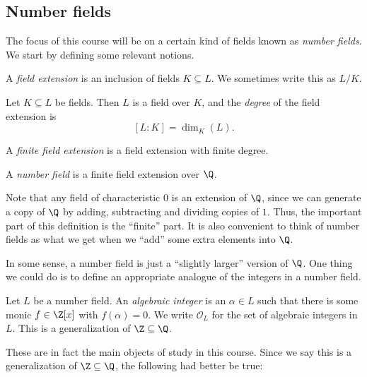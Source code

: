 \documentclass[a4paper]{article}
\begin{document}
\subsection{Number fields}
The focus of this course will be on a certain kind of fields known as \emph{number fields}. We start by defining some relevant notions.

\begin{defi}
  A \emph{field extension} is an inclusion of fields $K \subseteq L$. We sometimes write this as $L/K$.
\end{defi}

\begin{defi}
  Let $K \subseteq L$ be fields. Then $L$ is a field over $K$, and the \emph{degree} of the field extension is
  \[
    [L:K] = \dim_K (L).
  \]
\end{defi}

\begin{defi}
  A \emph{finite field extension} is a field extension with finite degree.
\end{defi}

\begin{defi}
  A \emph{number field} is a finite field extension over $\Q$.
\end{defi}
Note that any field of characteristic $0$ is an extension of $\Q$, since we can generate a copy of $\Q$ by adding, subtracting and dividing copies of $1$. Thus, the important part of this definition is the ``finite'' part. It is also convenient to think of number fields as what we get when we ``add'' some extra elements into $\Q$.

In some sense, a number field is just a ``slightly larger'' version of $\Q$. One thing we could do is to define an appropriate analogue of the integers in a number field.

\begin{defi}
  Let $L$ be a number field. An \emph{algebraic integer} is an $\alpha \in L$ such that there is some monic $f \in \Z[x]$ with $f(\alpha) = 0$. We write $\mathcal{O}_L$ for the set of algebraic integers in $L$. This is a generalization of $\Z \subseteq \Q$.
\end{defi}

These are in fact the main objects of study in this course. Since we say this is a generalization of $\Z \subseteq \Q$, the following had better be true:
\end{document}
